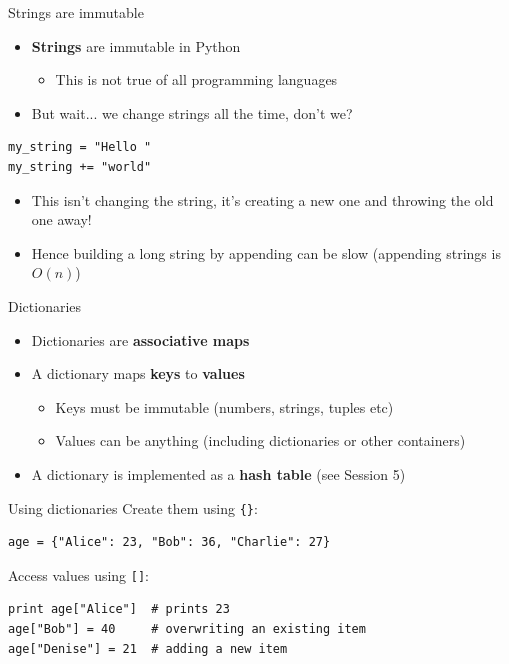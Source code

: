 \begin{frame}[fragile]{Strings are immutable}
	\begin{itemize}
		\pause\item \textbf{Strings} are immutable in Python
			\begin{itemize}
				\pause\item This is not true of all programming languages
			\end{itemize}
		\pause\item But wait... we change strings all the time, don't we?
	\end{itemize}
	\begin{lstlisting}
my_string = "Hello "
my_string += "world"
	\end{lstlisting}
	\begin{itemize}
		\pause\item This isn't changing the string, it's creating a new one and throwing the old one away!
		\pause\item Hence building a long string by appending can be slow (appending strings is $O(n)$)
	\end{itemize}
\end{frame}

\begin{frame}{Dictionaries}
	\begin{itemize}
		\pause\item Dictionaries are \textbf{associative maps}
		\pause\item A dictionary maps \textbf{keys} to \textbf{values}
			\begin{itemize}
				\pause\item Keys must be immutable (numbers, strings, tuples etc)
				\pause\item Values can be anything (including dictionaries or other containers)
			\end{itemize}
		\pause\item A dictionary is implemented as a \textbf{hash table} (see Session 5)
	\end{itemize}		
\end{frame}

\begin{frame}[fragile]{Using dictionaries}
	\pause Create them using \lstinline|{}|:
	\begin{lstlisting}
age = {"Alice": 23, "Bob": 36, "Charlie": 27}
	\end{lstlisting}
	\pause Access values using \lstinline{[]}:
	\begin{lstlisting}
print age["Alice"]  # prints 23
age["Bob"] = 40     # overwriting an existing item
age["Denise"] = 21  # adding a new item
	\end{lstlisting}
\end{frame}

